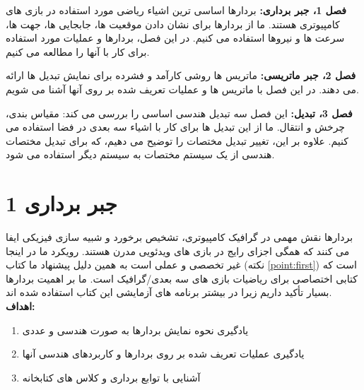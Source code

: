{\begin{spacing}{1.4}
        \textbf{فصل 1، جبر برداری:} بردارها اساسی ترین اشیاء ریاضی مورد استفاده در بازی های کامپیوتری هستند.
        ما از بردارها برای نشان دادن موقعیت ها، جابجایی ها، جهت ها، سرعت ها و نیروها استفاده می کنیم.
        در این فصل، بردارها و عملیات مورد استفاده برای کار با آنها را مطالعه می کنیم.

        \textbf{فصل 2، جبر ماتریسی:} ماتریس ها روشی کارآمد و فشرده برای نمایش تبدیل ها ارائه می دهند.
        در این فصل با ماتریس ها و عملیات تعریف شده بر روی آنها آشنا می شویم.

        \textbf{فصل 3، تبدیل:} این فصل سه تبدیل هندسی اساسی را بررسی می کند: مقیاس بندی، چرخش و انتقال.
        ما از این تبدیل ها برای کار با اشیاء سه بعدی در فضا استفاده می کنیم.
        علاوه بر این، تغییر تبدیل مختصات را توضیح می دهیم، که برای تبدیل مختصات هندسی از یک سیستم مختصات به سیستم دیگر استفاده می شود.
    \end{spacing}
}

\setcounter{chapter}{1}

\textbf{\vspace{80pt}}


\chapter{\textbf{1 جبر برداری}}
\textbf{\vspace{70pt}}
{
    \Large
    \begin{spacing}{1.5}
        بردارها نقش مهمی در گرافیک کامپیوتری، تشخیص برخورد و شبیه سازی فیزیکی ایفا می کنند که همگی اجزای رایج در بازی های ویدئویی مدرن هستند.
        رویکرد ما در اینجا غیر تخصصی و عملی است به همین دلیل پیشنهاد ما کتاب  (نکته \ref{point:first}) است که کتابی اختصاصی برای ریاضیات بازی های سه بعدی/گرافیک است.
        ما بر اهمیت بردارها بسیار تأکید داریم زیرا در بیشتر برنامه های آزمایشی این کتاب استفاده شده اند.
        \\

        \textbf{\LARGE \hspace{-40pt}اهداف:}
        \begin{enumerate}
            \item {یادگیری نحوه نمایش بردارها به صورت هندسی و عددی}
            \item {یادگیری عملیات تعریف شده بر روی بردارها و کاربردهای هندسی آنها}
            \item {آشنایی با توابع برداری و کلاس های کتابخانه }
        \end{enumerate}
    \end{spacing}
}
\newpage

